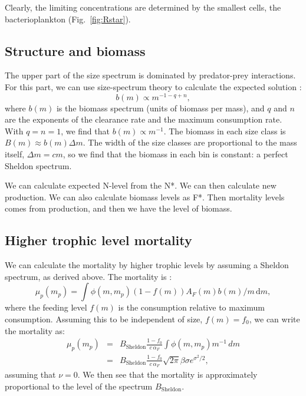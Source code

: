 \documentclass[11pt]{article}
\begin{document}
Clearly, the limiting concentrations are determined by the smallest
cells, the bacterioplankton (Fig.~\ref{fig:Rstar}).

\subsection{Structure and biomass}
The upper part of the size spectrum is dominated by predator-prey interactions. For this part, we can use size-spectrum theory to calculate the expected solution \citep{Andersen2006b}:
\begin{equation}
  b(m) \propto m^{-1-q+n},
\end{equation}
where $b(m)$ is the biomass spectrum (units of biomass per mass), and $q$ and $n$ are the exponents of the clearance rate and the maximum consumption rate. With $q=n=1$, we find that $b(m) \propto m^{-1}$.  The biomass in each size class is $B(m) \approx b(m)\Delta m$.  The width of the size classes are proportional to the mass itself, $\Delta m = c m$, so we find that the biomass in each bin is constant: a perfect Sheldon spectrum.


We can calculate expected N-level from the N*.  We can then calculate new production.  We can also calculate biomass levels as F*.  Then mortality levels comes from production, and then we have the level of biomass.


\subsection{Higher trophic level mortality}
We can calculate the mortality by higher trophic levels by assuming a Sheldon spectrum, as derived above.  The mortality is \citep{Hartvig2011}:
\begin{equation}
  \mu_p(m_p) = \int \phi(m, m_p) (1-f(m)) A_F(m) b(m)/m\, \mathrm{d}m,
\end{equation}
where the feeding level $f(m)$ is the consumption relative to maximum consumption.  Assuming this to be independent of size, $f(m) = f_0$, we can write the mortality as:
\begin{eqnarray}
  \mu_p(m_p) &=& B_\mathrm{Sheldon}  \frac{1-f_0}{c\,\alpha_F} \int \phi(m, m_p) m^{-1}\, dm \\
  &=& B_\mathrm{Sheldon} \frac{ 1-f_0}{c\,\alpha_F} \sqrt{2 \pi} \beta \sigma e^{\sigma^2/2},
\end{eqnarray}
assuming that $\nu = 0$.  We then see that the mortality is approximately proportional to the level of the spectrum $B_\mathrm{Sheldon}$. 


 

\end{document}
